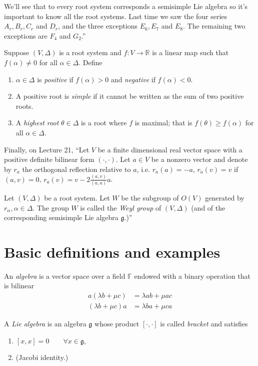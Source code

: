 We'll see that to every root system
corresponds a semisimple Lie algebra so
it's important to know all the root
systems. Last time we saw the four series
$A_r,B_r,C_r$ and $D_r$, and the three
exceptions $E_6,E_7$ and $E_8$. The
remaining two exceptions are $F_4$ and
$G_2$.''

Suppose $(V,\Delta)$ is a root system and
$f:V \to \mathbb{R}$ is a linear map such
that $f(\alpha)\neq 0$ for all $\alpha \in
\Delta$. Define \cite[Definition
17.1]{KLAL}
\begin{enumerate}
\item $\alpha \in \Delta$ is {\it positive}
if $f(\alpha)>0$
and  {\it negative} if $f(\alpha)<0$.
\item A positive root is {\it simple} if it
cannot be written
as the sum of two positive roots.
\item A {\it highest root} $\theta \in
\Delta$ is
a root where $f$ is maximal;
that is $f(\theta)\geq f(\alpha)$ for all
$\alpha \in \Delta$.
\end{enumerate}

Finally, on Lecture 21,
``Let $V$ be a finite dimensional real vector
space
with a positive definite bilinear form
$(\cdot,\cdot)$.
Let $a \in V$ be a nonzero vector and denote
by $r_a$ the orthogonal reflection relative
to $a$,
i.e. $r_a(a)=-a$, $r_a(v)=v$ if $(a,v)=0$,
$r_a(v)=v-2\frac{(a,v)}{(a,a)}a$.

Let $(V,\Delta)$ be a root system.
Let $W$ be the subgroup of $O(V)$ generated
by $r_\alpha, \alpha \in \Delta$.
The group $W$ is called the {\it Weyl group}
of $(V,\Delta)$
(and of the corresponding semisimple Lie
algebra $\mathfrak{g}$.)''

\section{Basic definitions and examples}
\label{section-basic-defin-examp}

\begin{definition}
\label{definition-algebra}
An {\it algebra} is a vector space over a
field $\mathbb{F}$ endowed with a
binary operation that is bilinear
$$
\begin{aligned}
a(\lambda b+\mu c)&=\lambda ab+\mu ac\\
(\lambda b + \mu c) a &= \lambda b a + \mu c
a
\end{aligned}
$$
\end{definition}

\begin{definition}
\label{definition-Lie-algebra}
A {\it Lie algebra} is an algebra
$\mathfrak{g}$
whose product $[\cdot,\cdot]$ is called
{\it bracket} and satisfies
\begin{enumerate}
\item $[x,x]=0\qquad \forall x\in
\mathfrak{g}$,
\item (Jacobi identity.)
\end{enumerate}
\end{definition}

